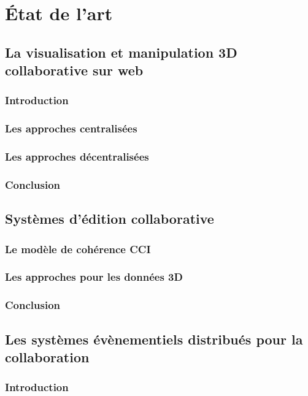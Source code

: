\chapter{État de l'art}
\chaptertable

\section{La visualisation et manipulation 3D collaborative sur web}
	\subsection{Introduction}
	\subsection{Les approches centralisées}
	\subsection{Les approches décentralisées}
	\subsection{Conclusion}

\section{Systèmes d'édition collaborative}
	\subsection{Le modèle de cohérence CCI}
	\subsection{Les approches pour les données 3D}
	\subsection{Conclusion}


\section{Les systèmes évènementiels distribués pour la collaboration}

	\subsection{Introduction}
